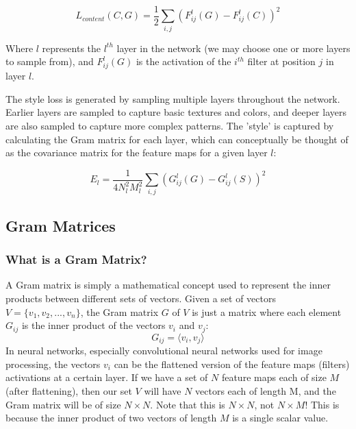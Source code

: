 \documentclass[12pt]{article}
\begin{document}
\begin{equation}
    L_{content}(C, G) = \frac{1}{2} \sum_{i, j} \left( F^l_{ij}(G) - F^l_{ij}(C) \right)^2
\end{equation}

Where \(l\) represents the \(l^{th}\) layer in the network (we may choose one or more layers to sample from), and \(F^l_{ij}(G)\) is the activation of the \(i^{th}\) filter at position \(j\) in layer \(l\).

The style loss is generated by sampling multiple layers throughout the network. Earlier layers are sampled to capture basic textures and colors, and deeper layers are also sampled to capture more complex patterns. The 'style' is captured by calculating the Gram matrix for each layer, which can conceptually be thought of as the covariance matrix for the feature maps for a given layer \(l\):

\begin{equation}
    E_l = \frac{1}{4N_l^2M_l^2} \sum_{i, j} \left( G^l_{ij}(G) - G^l_{ij}(S) \right)^2
\end{equation}

\subsection{Gram Matrices}
\subsubsection{What is a Gram Matrix?}
A Gram matrix is simply a mathematical concept used to represent the inner products between different sets of vectors. Given a set of vectors \(V = \{v_1, v_2, ..., v_n\}\), the Gram matrix \(G\) of \(V\) is just a matrix where each element \(G_{ij}\) is the inner product of the vectors \(v_i\) and \(v_j\):
\[G_{ij} = \langle v_i, v_j \rangle \]
In neural networks, especially convolutional neural networks used for image processing, the vectors \(v_i\) can be the flattened version of the feature maps (filters) activations at a certain layer. If we have a set of  \(N\) feature maps each of size \(M\) (after flattening), then our set \(V\) will have \(N\) vectors each of length M, and the Gram matrix will be of size \(N \times N\). Note that this is \(N \times N\), not \(N \times M\)! This is because the inner product of two vectors of length \(M\) is a single scalar value.
\end{document}
